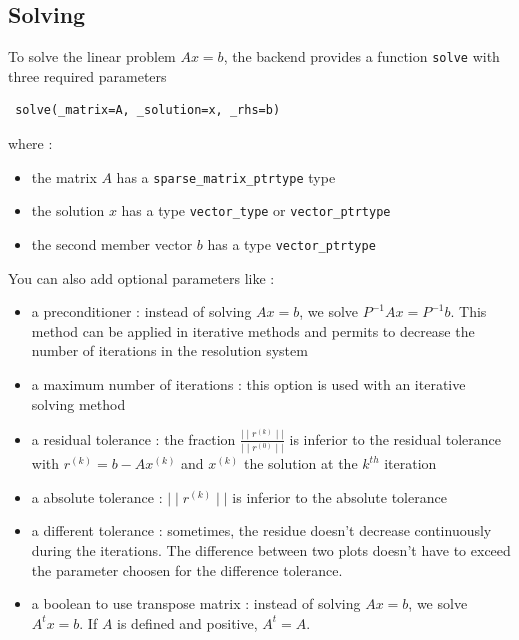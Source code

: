 
\subsection{Solving}
\label{sec:solving}

To solve the linear problem $Ax=b$, the backend provides a function \lstinline!solve! with three required parameters
\begin{lstlisting}
 solve(_matrix=A, _solution=x, _rhs=b)
\end{lstlisting}
where :
\begin{itemize}
\item the matrix $A$ has a \lstinline!sparse_matrix_ptrtype! type
\item the solution $x$ has a type \lstinline!vector_type! or \lstinline!vector_ptrtype!
\item the second member vector $b$ has a type \lstinline!vector_ptrtype!
\end{itemize}
You can also add optional parameters like :
\begin{itemize}

\item a preconditioner : instead of solving $Ax=b$, we solve $P^{-1}Ax= P^{-1}b$. This method can be applied in iterative methods and permits to decrease the number of iterations in the resolution system

\item a maximum number of iterations : this option is used with an iterative solving method

\item a residual tolerance : the fraction $\displaystyle{\frac{\mid\mid r^{(k)} \mid\mid }{\mid\mid r^{(0)} \mid\mid}}$ is inferior to the residual tolerance with
$r^{(k)}=b-Ax^{(k)}$ and $x^{(k)}$ the solution at the $k^{th}$ iteration

\item a absolute tolerance : $\mid\mid r^{(k)} \mid\mid $ is inferior to the absolute tolerance

\item a different tolerance : sometimes, the residue doesn’t decrease continuously during the iterations. The difference between two plots doesn’t have to exceed the parameter choosen for the difference tolerance.

\item a boolean to use transpose matrix : instead of solving $Ax=b$, we solve $A^{t}x=b$. If $A$ is defined and positive, $A^{t}=A$.

\end{itemize}

